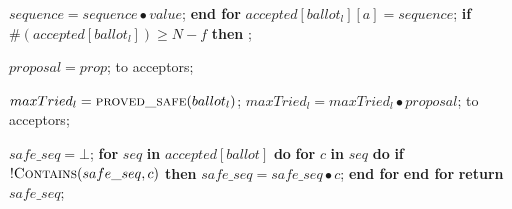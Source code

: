 \begin{algorithm}
\begin{algorithmic}[1]
		\State \hspace{\algorithmicindent}\hspace{\algorithmicindent}\hspace{\algorithmicindent}\hspace{\algorithmicindent}\hspace{\algorithmicindent}\hspace{\algorithmicindent} $sequence = sequence \bullet value$;
		\State \hspace{\algorithmicindent}\hspace{\algorithmicindent}\hspace{\algorithmicindent} \textbf{end for}
		\State \hspace{\algorithmicindent}\hspace{\algorithmicindent}\hspace{\algorithmicindent}  $accepted[ballot_l][a] = sequence$;
		\State
		\State \hspace{\algorithmicindent} \textbf{if} $\#(accepted[ballot_l]) \geq N-f$ \textbf{then} 
		\State \hspace{\algorithmicindent}\hspace{\algorithmicindent} ;

		\State
		\State $proposal = prop$;
		\State {} to acceptors;
		\EndFunction
		
		\State
		\State $maxTried_l = \Call{proved\_safe}{ballot_l}$;
		\State $maxTried_l = maxTried_l \bullet proposal$;
		\State {} to acceptors;
		\EndFunction
		
		\State
		\State $safe\_seq = \bot$;
		\State \textbf{for} $seq$ \textbf{in} $accepted[ballot]$ \textbf{do}
		\State \hspace{\algorithmicindent} \textbf{for} $c$ \textbf{in} $seq$ \textbf{do} 
		\State \hspace{\algorithmicindent}\hspace{\algorithmicindent} \textbf{if} $!\Call{Contains}{safe\_seq,c}$ \textbf{then}
		\State \hspace{\algorithmicindent}\hspace{\algorithmicindent}\hspace{\algorithmicindent} $safe\_seq =  safe\_seq \bullet c$;
		\State \hspace{\algorithmicindent} \textbf{end for}
		\State \textbf{end for}
		\State \textbf{return} $safe\_seq$;
		\EndFunction
		

\end{algorithmic}
\end{algorithm}
